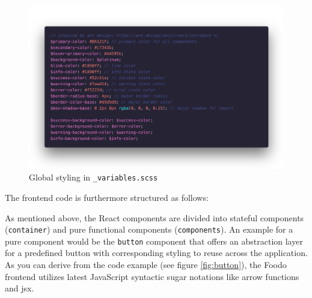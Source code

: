 \begin{figure}[ht]
	\captionsetup{justification=centering}
	\begin{center}
		\includegraphics[scale=0.25]{Ressourcen/img/code/scss.png}
		\vspace{-3em}
		\caption{Global styling in \texttt{\_variables.scss}}
	\end{center}
\end{figure}


The frontend code is furthermore structured as follows:


As mentioned above, the React components are divided into stateful components (\texttt{container}) and pure functional components (\texttt{components}). An example for a pure component would be the \texttt{button} component that offers an abstraction layer for a predefined button with corresponding styling to reuse across the application. As you can derive from the code example (see figure \ref{fig:button}), the Foodo frontend utilizes latest JavaScript syntactic sugar notations like arrow functions and \gls{jsx}.

